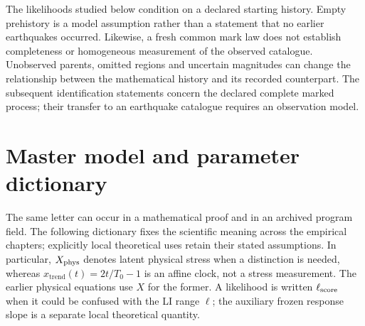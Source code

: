 The likelihoods studied below condition on a declared starting history. Empty prehistory is a model assumption rather than a statement that no earlier earthquakes occurred. Likewise, a fresh common mark law does not establish completeness or homogeneous measurement of the observed catalogue. Unobserved parents, omitted regions and uncertain magnitudes can change the relationship between the mathematical history and its recorded counterpart. The subsequent identification statements concern the declared complete marked process; their transfer to an earthquake catalogue requires an observation model.


\section{Master model and parameter dictionary}\label{sec:master-models}

The same letter can occur in a mathematical proof and in an archived program field. The following dictionary fixes the scientific meaning across the empirical chapters; explicitly local theoretical uses retain their stated assumptions. In particular, $X_{\rm phys}$ denotes latent physical stress when a distinction is needed, whereas $x_{\mathrm{trend}}(t)=2t/T_0-1$ is an affine clock, not a stress measurement. The earlier physical equations use $X$ for the former. A likelihood is written $\ell_{\rm score}$ when it could be confused with the LI range $\ell$; the auxiliary frozen response slope is a separate local theoretical quantity.

